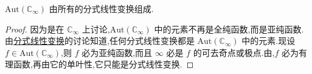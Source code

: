 \documentclass[../../main.tex]{subfiles}
\begin{document}
\begin{theorem}\label{theorem:定理5.3.5}
\( \mathrm{Aut}(\mathbb{C}_{\infty}) \) 由所有的分式线性变换组成.
\end{theorem}
\begin{proof}
因为是在 \( \mathbb{C}_{\infty} \) 上讨论,\( \mathrm{Aut}(\mathbb{C}_{\infty}) \) 中的元素不再是全纯函数,而是亚纯函数.由\hyperref[section:2.2.5]{分式线性变换}的讨论知道,任何分式线性变换都是 \( \mathrm{Aut}(\mathbb{C}_{\infty}) \) 中的元素.现设 \( f \in \mathrm{Aut}(\mathbb{C}_{\infty}) \),则 \( f \) 必为亚纯函数,而且 \( \infty \) 必是 \( f \) 的可去奇点或极点.由,\( f \) 必为有理函数,再由它的单叶性,它只能是分式线性变换.

\end{proof}
\end{document}
